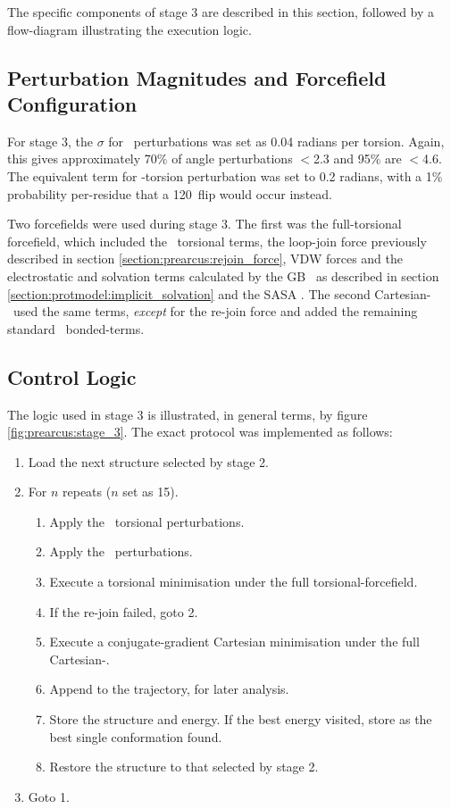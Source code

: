 The specific components of stage 3 are described in this section, followed by a flow-diagram illustrating the execution logic.

\subsection{Perturbation Magnitudes and Forcefield Configuration}
\label{section:prearcus:stage3_refinement}

For stage 3, the $\sigma$ for
\mainchain\ perturbations was set as 0.04 radians per torsion.
Again, this gives approximately 70\% of angle perturbations \mbox{$<$2.3\degree} and 95\% are \mbox{$<$4.6\degree}.
The equivalent term for \Chi-torsion perturbation was set to 0.2 radians, with a 1\% probability per-residue that a 120\degree\ flip would occur instead.

Two forcefields were used during stage 3. The first was the full-torsional forcefield, which included the \amberff\ torsional terms, the loop-join force previously described in section \ref{section:prearcus:rejoin_force}, VDW forces and the electrostatic and solvation  terms calculated by the GB \forcefield\  as described in section \ref{section:protmodel:implicit_solvation} and the SASA \forcefield.
The second Cartesian-\forcefield\ used the same terms, \emph{except} for the re-join force and added the remaining standard \amberff\ bonded-terms.

\subsection{Control Logic}

The logic used in stage 3 is illustrated, in general terms, by figure \ref{fig:prearcus:stage_3}. The exact protocol  was implemented as follows:
 
\begin{enumerate} \isep
        \item Load the next structure selected by stage 2.
        \item For $n$ repeats ($n$ set as 15).
        \begin{enumerate} \isep
        \item Apply the \mainchain\ torsional perturbations.
        \item Apply the \sidechain\ perturbations.
        \item Execute a torsional minimisation under the full torsional-forcefield.
        \item If the re-join failed, goto 2.
        \item Execute a conjugate-gradient Cartesian minimisation under the full Cartesian-\forcefield.
        \item Append to the trajectory, for later analysis.
        \item Store the structure and energy. If the best energy visited, store as the best single conformation found.
        \item Restore the structure to that selected by stage 2.
        \end{enumerate}
        \item Goto 1.
\end{enumerate}

